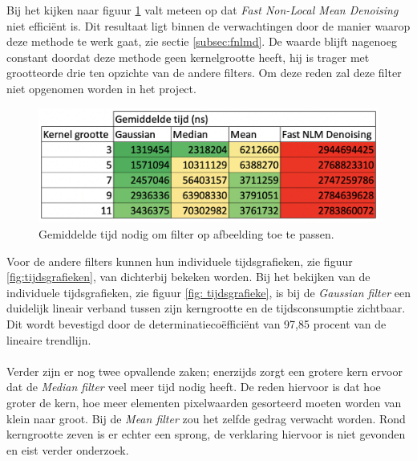 Bij het kijken naar figuur \ref{fig:tijd} valt meteen op dat \textit{Fast Non-Local Mean Denoising} niet efficiënt is. Dit resultaat ligt binnen de verwachtingen door de manier waarop deze methode te werk gaat, zie sectie \ref{subsec:fnlmd}. De waarde blijft nagenoeg constant doordat deze methode geen kernelgrootte heeft, hij is trager met grootteorde drie ten opzichte van de andere filters. Om deze reden zal deze filter niet opgenomen worden in het project. 

\begin{figure}[h!]
    \centering
    \includegraphics[scale=0.5]{img/tijdsconsumptie}
    \caption{Gemiddelde tijd nodig om filter op afbeelding toe te passen.}
    \label{fig:tijd}
\end{figure}

Voor de andere filters kunnen hun individuele tijdsgrafieken, zie figuur \ref{fig:tijdsgrafieken}, van dichterbij bekeken worden. 
Bij het bekijken van de individuele tijdsgrafieken, zie figuur \ref{fig: tijdsgrafieke},  is bij de \textit{Gaussian filter} een duidelijk lineair verband tussen zijn kerngrootte en de tijdsconsumptie zichtbaar. Dit wordt bevestigd door de determinatiecoëfficiënt van 97,85 procent van de lineaire trendlijn. 

\paragraph{}
Verder zijn er nog twee opvallende zaken; enerzijds zorgt een grotere kern ervoor dat de \textit{Median filter} veel meer tijd nodig heeft. De reden hiervoor is dat hoe groter de kern, hoe meer elementen pixelwaarden gesorteerd moeten worden van klein naar groot. Bij de {\it Mean filter} zou het zelfde gedrag verwacht worden. Rond kerngrootte zeven is er echter een sprong, de verklaring hiervoor is niet gevonden en eist verder onderzoek.


